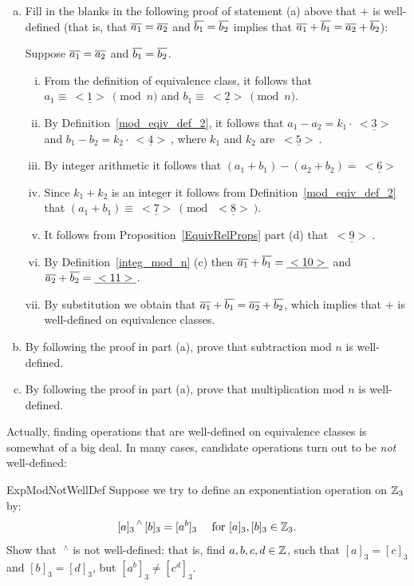 \begin{exercise}{54} 
\begin{enumerate}[(a)]
\item 
Fill in the blanks in the following proof of statement (a) above that $\mathbin{+}$ is well-defined (that is, that  $\overline{a_1} = \overline{a_2}$ and $\overline{b_1} = \overline{b_2}$ implies that $\overline{a_1} + \overline{b_1} = \overline{a_2} + \overline{b_2}$):

Suppose $\overline{a_1} = \overline{a_2}$ and $\overline{b_1} = \overline{b_2}$. 
\begin{enumerate}[(i)]
\item
From the definition of equivalence class, it follows that  $a_1 \equiv \underline{~<1>~} \pmod{n}$ and $b_1 \equiv \underline{~<2>~} \pmod{n}$. 
\item  
By Definition~\ref{mod_eqiv_def_2}, it follows that 
$a_1 - a_2 = k_1 \cdot \underline{~<3>~}$ and $b_1 - b_2 = k_2 \cdot \underline{~<4>~}$, where $k_1$ and $k_2$ are $\underline{~<5>~}$. 
\item
By integer arithmetic it follows that $(a_1 + b_1) - (a_2 + b_2) =  \underline{~<6>~}$
\item
Since $k_1 + k_2$ is an integer it follows from Definition~\ref{mod_eqiv_def_2} that $(a_1 + b_1) \equiv \underline{~<7>~} \pmod{\underline{~<8>~}}$.
\item 
It follows from Proposition~\ref{EquivRelProps} part (d) that $\underline{~<9>~}$.
\item
By Definition~\ref{integ_mod_n} (c) then $\overline{a_1} \mathbin{+} \overline{b_1} =  \underline{~<10>~}$ and $\overline{a_2} \mathbin{+} \overline{b_2} =  \underline{~<11>~}$.
\item
By substitution we obtain that $\overline{a_1} + \overline{b_1} = \overline{a_2} + \overline{b_2}$, which implies that  $\mathbin{+}$ is well-defined on equivalence classes.
\end{enumerate}
\item By following the proof in part (a), prove that subtraction mod $n$ is well-defined.
\item By following the proof in part (a), prove that multiplication mod $n$ is well-defined.
\end{enumerate}
\end{exercise}

Actually, finding operations that are well-defined on equivalence classes is somewhat of a big deal. In many cases, candidate operations turn out to be \emph{not} well-defined:

\begin{exercise}{ExpModNotWellDef}
Suppose we try to define an exponentiation operation on $\mathbb{Z}_3$ by:
\[
 {[a]_3}^{\,\wedge} \, [b]_3 = [a^b]_3 \quad \text{ for } [a]_3, [b]_3 \in \mathbb{Z}_3. \]
Show that $\;^{\wedge}$ is not well-defined: that is, find $a, b, c, d \in \mathbb{Z}$, such that $[a]_3 = [c]_3$ and $[b]_3 = [d]_3$, but $\left[a^b \right]_3 \neq \left[c^d \right]_3$.
\end{exercise}


